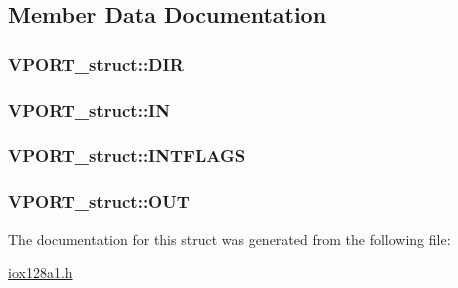 \subsection{Member Data Documentation}
\hypertarget{struct_v_p_o_r_t__struct_ae8fe5e80d081564b68412bc3546180ec}{
\subsubsection[{DIR}]{ {\bf VPORT\_\-struct::DIR}}}
\label{struct_v_p_o_r_t__struct_ae8fe5e80d081564b68412bc3546180ec}
\hypertarget{struct_v_p_o_r_t__struct_ad0328b64874040f2c48ac748291584e0}{
\subsubsection[{IN}]{ {\bf VPORT\_\-struct::IN}}}
\label{struct_v_p_o_r_t__struct_ad0328b64874040f2c48ac748291584e0}
\hypertarget{struct_v_p_o_r_t__struct_a808c432620513ead0ca8dc127715e24b}{
\subsubsection[{INTFLAGS}]{ {\bf VPORT\_\-struct::INTFLAGS}}}
\label{struct_v_p_o_r_t__struct_a808c432620513ead0ca8dc127715e24b}
\hypertarget{struct_v_p_o_r_t__struct_af1e9d35b409cae9317ca4efe44736ec4}{
\subsubsection[{OUT}]{ {\bf VPORT\_\-struct::OUT}}}
\label{struct_v_p_o_r_t__struct_af1e9d35b409cae9317ca4efe44736ec4}


The documentation for this struct was generated from the following file:\begin{DoxyCompactItemize}
\item 
\hyperlink{iox128a1_8h}{iox128a1.h}\end{DoxyCompactItemize}
